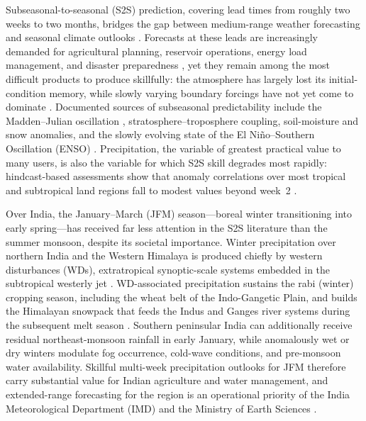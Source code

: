 \documentclass[11pt]{article}
\begin{document}
Subseasonal-to-seasonal (S2S) prediction, covering lead times from
roughly two weeks to two months, bridges the gap between medium-range
weather forecasting and seasonal climate outlooks
\citep{vitart2017,nas2016}. Forecasts at these leads are increasingly
demanded for agricultural planning, reservoir operations, energy load
management, and disaster preparedness \citep{white2017}, yet they
remain among the most difficult products to produce skillfully: the
atmosphere has largely lost its initial-condition memory, while slowly
varying boundary forcings have not yet come to dominate
\citep{mariotti2020}. Documented sources of subseasonal predictability
include the Madden--Julian oscillation \citep[MJO;][]{zhang2005},
stratosphere--troposphere coupling, soil-moisture and snow anomalies,
and the slowly evolving state of the El Ni\~no--Southern Oscillation
(ENSO) \citep{mariotti2020,domeisen2022}. Precipitation, the variable
of greatest practical value to many users, is also the variable for
which S2S skill degrades most rapidly: hindcast-based assessments show
that anomaly correlations over most tropical and subtropical land
regions fall to modest values beyond week~2
\citep{deandrade2019,pegion2019}.

Over India, the January--March (JFM) season---boreal winter
transitioning into early spring---has received far less attention in
the S2S literature than the summer monsoon, despite its societal
importance. Winter precipitation over northern India and the Western
Himalaya is produced chiefly by western disturbances (WDs),
extratropical synoptic-scale systems embedded in the subtropical
westerly jet \citep{dimri2015,hunt2018}. WD-associated precipitation
sustains the rabi (winter) cropping season, including the wheat belt of
the Indo-Gangetic Plain, and builds the Himalayan snowpack that feeds
the Indus and Ganges river systems during the subsequent melt season
\citep{dimri2015}. Southern peninsular India can additionally receive
residual northeast-monsoon rainfall in early January, while anomalously
wet or dry winters modulate fog occurrence, cold-wave conditions, and
pre-monsoon water availability. Skillful multi-week precipitation
outlooks for JFM therefore carry substantial value for Indian
agriculture and water management, and extended-range forecasting for
the region is an operational priority of the India Meteorological
Department (IMD) and the Ministry of Earth Sciences
\citep{rao2019,pattanaik2019}.
\end{document}
